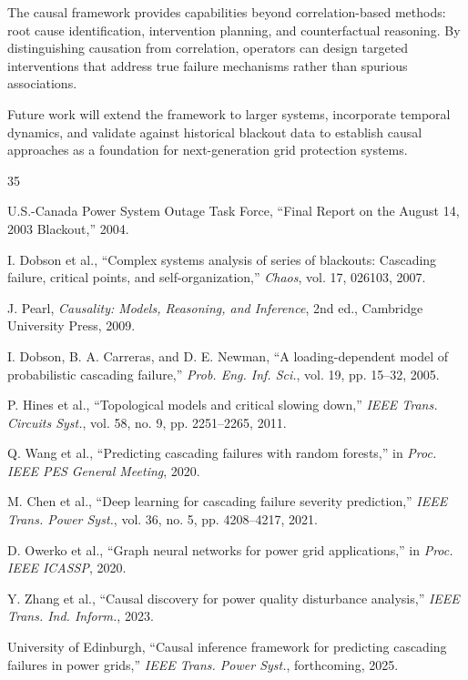 \documentclass[journal,12pt,onecolumn]{IEEEtran}
\begin{document}
The causal framework provides capabilities beyond correlation-based methods: root cause identification, intervention planning, and counterfactual reasoning. By distinguishing causation from correlation, operators can design targeted interventions that address true failure mechanisms rather than spurious associations.

Future work will extend the framework to larger systems, incorporate temporal dynamics, and validate against historical blackout data to establish causal approaches as a foundation for next-generation grid protection systems.

\begin{thebibliography}{35}

U.S.-Canada Power System Outage Task Force, ``Final Report on the August 14, 2003 Blackout,'' 2004.

I. Dobson et al., ``Complex systems analysis of series of blackouts: Cascading failure, critical points, and self-organization,'' \emph{Chaos}, vol. 17, 026103, 2007.

J. Pearl, \emph{Causality: Models, Reasoning, and Inference}, 2nd ed., Cambridge University Press, 2009.

I. Dobson, B. A. Carreras, and D. E. Newman, ``A loading-dependent model of probabilistic cascading failure,'' \emph{Prob. Eng. Inf. Sci.}, vol. 19, pp. 15--32, 2005.

P. Hines et al., ``Topological models and critical slowing down,'' \emph{IEEE Trans. Circuits Syst.}, vol. 58, no. 9, pp. 2251--2265, 2011.

Q. Wang et al., ``Predicting cascading failures with random forests,'' in \emph{Proc. IEEE PES General Meeting}, 2020.

M. Chen et al., ``Deep learning for cascading failure severity prediction,'' \emph{IEEE Trans. Power Syst.}, vol. 36, no. 5, pp. 4208--4217, 2021.

D. Owerko et al., ``Graph neural networks for power grid applications,'' in \emph{Proc. IEEE ICASSP}, 2020.

Y. Zhang et al., ``Causal discovery for power quality disturbance analysis,'' \emph{IEEE Trans. Ind. Inform.}, 2023.

University of Edinburgh, ``Causal inference framework for predicting cascading failures in power grids,'' \emph{IEEE Trans. Power Syst.}, forthcoming, 2025.


\end{thebibliography}
\end{document}
